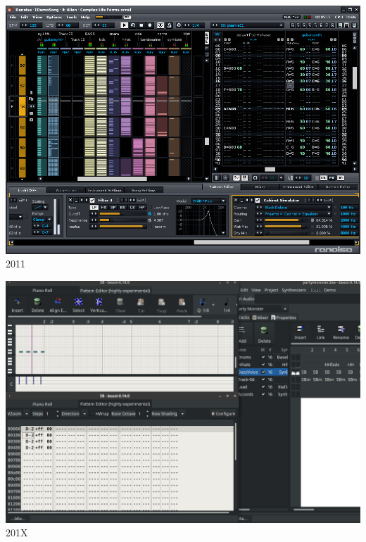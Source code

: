 \documentclass{beamer}
\begin{document}
\begin{frame}
  \begin{center}
    \includegraphics[scale=0.286]{images/renoise.png}\\
    2011
  \end{center}
\end{frame}

\begin{frame}
  \begin{center}
    \includegraphics[scale=0.798]{images/beast-resized.png}\\
    201X
  \end{center}
\end{frame}
\end{document}
